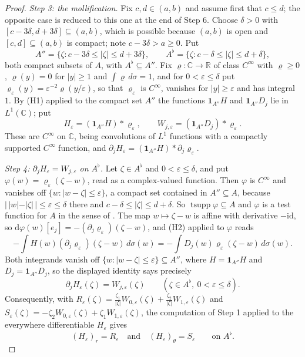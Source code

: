 \begin{proof}
\emph{Step 3: the mollification.}  Fix $c,d\in(a,b)$ and assume first that
$c\le d$; the opposite case is reduced to this one at the end of Step 6.  Choose $\delta>0$ with
$[c-3\delta,d+3\delta]\subseteq(a,b)$, which is possible because $(a,b)$ is
open and $[c,d]\subseteq(a,b)$ is compact; note $c-3\delta>a\ge0$.  Put
\[
  A''=\{\zeta:c-3\delta\le|\zeta|\le d+3\delta\},\qquad
  A^{\flat}=\{\zeta:c-\delta\le|\zeta|\le d+\delta\},
\]
both compact subsets of $A$, with $A^\flat\subseteq A''$.  Fix
$\varrho\colon\mathbb{C}\to\mathbb{R}$ of class $C^\infty$ with $\varrho\ge0$,
$\varrho(y)=0$ for $|y|\ge1$ and $\int\varrho\,d\sigma=1$, and for
$0<\varepsilon\le\delta$ put
$\varrho_\varepsilon(y)=\varepsilon^{-2}\varrho(y/\varepsilon)$, so that
$\varrho_\varepsilon$ is $C^\infty$, vanishes for $|y|\ge\varepsilon$ and has
integral $1$.  By (H1) applied to the compact set $A''$ the functions
$\mathbf1_{A''}H$ and $\mathbf1_{A''}D_j$ lie in $L^{1}(\mathbb{C})$; put
\[
  H_\varepsilon=(\mathbf1_{A''}H)*\varrho_\varepsilon,\qquad
  W_{j,\varepsilon}=(\mathbf1_{A''}D_j)*\varrho_\varepsilon .
\]
These are $C^\infty$ on $\mathbb{C}$, being convolutions of $L^{1}$ functions
with a compactly supported $C^\infty$ function, and
$\partial_jH_\varepsilon=(\mathbf1_{A''}H)*\partial_j\varrho_\varepsilon$.

\emph{Step 4: $\partial_jH_\varepsilon=W_{j,\varepsilon}$ on $A^\flat$.}  Let
$\zeta\in A^\flat$ and $0<\varepsilon\le\delta$, and put
$\varphi(w)=\varrho_\varepsilon(\zeta-w)$, read as a complex-valued function.
Then $\varphi$ is $C^\infty$ and vanishes off
$\{w:|w-\zeta|\le\varepsilon\}$, a compact set contained in $A''\subseteq A$,
because $|\,|w|-|\zeta|\,|\le\varepsilon\le\delta$ there and
$c-\delta\le|\zeta|\le d+\delta$.  So
$\operatorname{tsupp}\varphi\subseteq A$ and $\varphi$ is a test function for
$A$ in the sense of .  The map $w\mapsto\zeta-w$ is affine
with derivative $-\mathrm{id}$, so
$\mathrm{d}\varphi(w)[e_j]=-(\partial_j\varrho_\varepsilon)(\zeta-w)$, and (H2)
applied to $\varphi$ reads
\[
  -\int H(w)(\partial_j\varrho_\varepsilon)(\zeta-w)\,d\sigma(w)
  =-\int D_j(w)\varrho_\varepsilon(\zeta-w)\,d\sigma(w).
\]
Both integrands vanish off $\{w:|w-\zeta|\le\varepsilon\}\subseteq A''$, where
$H=\mathbf1_{A''}H$ and $D_j=\mathbf1_{A''}D_j$, so the displayed identity says
precisely
\begin{equation}\tag{4}
  \partial_jH_\varepsilon(\zeta)=W_{j,\varepsilon}(\zeta)
  \qquad(\zeta\in A^\flat,\ 0<\varepsilon\le\delta).
\end{equation}
Consequently, with
$R_\varepsilon(\zeta)=\frac{\zeta_1}{|\zeta|}W_{0,\varepsilon}(\zeta)
+\frac{\zeta_2}{|\zeta|}W_{1,\varepsilon}(\zeta)$ and
$S_\varepsilon(\zeta)=-\zeta_2W_{0,\varepsilon}(\zeta)
+\zeta_1W_{1,\varepsilon}(\zeta)$, the computation of Step 1 applied to the
everywhere differentiable $H_\varepsilon$ gives
\begin{equation}\tag{5}
  (H_\varepsilon)_r=R_\varepsilon\quad\text{and}\quad
  (H_\varepsilon)_\theta=S_\varepsilon\qquad\text{on }A^\flat .
\end{equation}


\end{proof}
